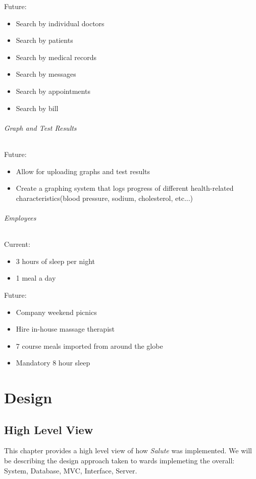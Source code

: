 \documentclass[12pt]{report}
\begin{document}
Future: 
\begin{itemize}
\item Search by individual doctors 
\item Search by patients
\item Search by medical records 
\item Search by messages
\item Search by appointments
\item Search by bill
\end{itemize}

\paragraph{Graph and Test Results}
Future: 
\begin{itemize}
\item Allow for uploading graphs and test results
\item Create a graphing system that logs progress of different health-related characteristics(blood pressure, sodium, cholesterol, etc...)
\end{itemize}

\paragraph{Employees}

Current:
\begin{itemize}
\item 3 hours of sleep per night
\item 1 meal a day
\end{itemize}

Future:
\begin{itemize}
\item Company weekend picnics
\item Hire in-house massage therapist
\item 7 course meals imported from around the globe
\item Mandatory 8 hour sleep
\end{itemize}

\part{Design}

\chapter{High Level View}
This chapter provides a high level view of how \emph{Salute} was implemented.  We will be describing the design approach taken to wards implemeting the overall: System, Database, MVC, Interface, Server.
\end{document}
